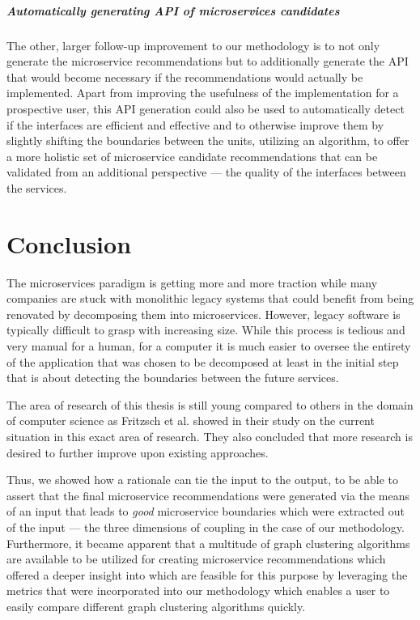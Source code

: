 \documentclass[12pt,a4paper]{report}
\begin{document}
\paragraph{Automatically generating API of microservices candidates}
The other, larger follow-up improvement to our methodology is to not only
generate the microservice recommendations but to additionally generate the
API that would become necessary if the recommendations would actually be
implemented. Apart from improving the usefulness of the implementation
for a prospective user, this API generation could also be used to
automatically detect if the interfaces are efficient and effective and
to otherwise improve them by slightly shifting the boundaries between
the units, utilizing an algorithm, to offer a more holistic set of
microservice candidate recommendations that can be validated from an
additional perspective --- the quality of the interfaces between the services.




\chapter{Conclusion} \label{chap:conclusion}

The microservices paradigm is getting more and more traction while
many companies are stuck with monolithic legacy systems that could
benefit from being renovated by decomposing them into microservices.
However, legacy software is typically difficult to grasp with increasing size.
While this process is tedious and very manual for a human,
for a computer it is much easier to oversee the entirety of the
application that was chosen to be decomposed at least in the initial
step that is about detecting the boundaries between the future services.

The area of research of this thesis is still young compared to others
in the domain of computer science as Fritzsch et al. showed in their
study on the current situation in this exact area of research.
They also concluded that more research is desired to further improve
upon existing approaches.

Thus, we showed how a rationale can tie the input to the output,
to be able to assert that the final microservice recommendations
were generated via the means of an input that leads to \textit{good}
microservice boundaries which were extracted out of the input ---
the three dimensions of coupling in the case of our methodology.
Furthermore, it became apparent that a multitude of graph clustering
algorithms are available to be utilized for creating microservice
recommendations which offered a deeper insight into which are
feasible for this purpose by leveraging the metrics that were
incorporated into our methodology which enables a user to easily
compare different graph clustering algorithms quickly.
\end{document}
